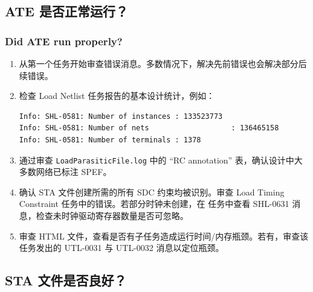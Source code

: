 \subsection{ATE 是否正常运行？}
\subsubsection*{Did ATE run properly?}
\begin{enumerate}
  \item 从第一个任务开始审查错误消息。多数情况下，解决先前错误也会解决部分后续错误。
  \item 检查 Load Netlist 任务报告的基本设计统计，例如：
\begin{lstlisting}
Info: SHL-0581: Number of instances : 133523773
Info: SHL-0581: Number of nets                   : 136465158
Info: SHL-0581: Number of terminals : 1378
\end{lstlisting}
  \item 通过审查 \texttt{LoadParasiticFile.log} 中的 ``RC annotation'' 表，确认设计中大多数网络已标注 SPEF。
  \item 确认 STA 文件创建所需的所有 SDC 约束均被识别。审查 Load Timing Constraint 任务中的错误。若部分时钟未创建，在  任务中查看 SHL-0631 消息，检查未时钟驱动寄存器数量是否可忽略。
  \item 审查 HTML 文件，查看是否有子任务造成运行时间/内存瓶颈。若有，审查该任务发出的 UTL-0031 与 UTL-0032 消息以定位瓶颈。
\end{enumerate}

\subsection{STA 文件是否良好？}
